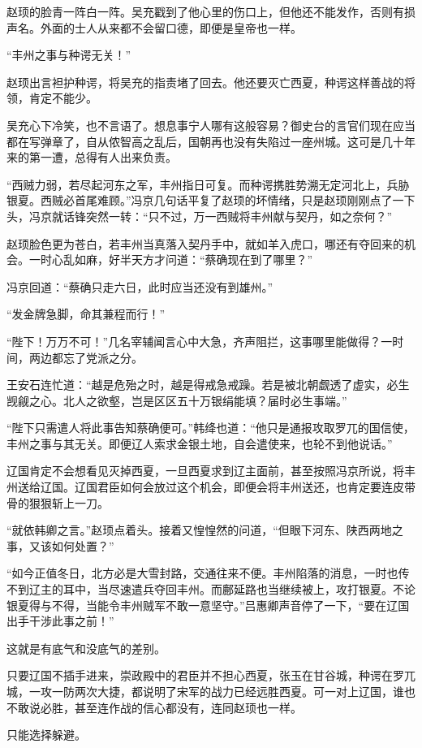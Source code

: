 赵顼的脸青一阵白一阵。吴充戳到了他心里的伤口上，但他还不能发作，否则有损声名。外面的士人从来都不会留口德，即便是皇帝也一样。

“丰州之事与种谔无关！”

赵顼出言袒护种谔，将吴充的指责堵了回去。他还要灭亡西夏，种谔这样善战的将领，肯定不能少。

吴充心下冷笑，也不言语了。想息事宁人哪有这般容易？御史台的言官们现在应当都在写弹章了，自从侬智高之乱后，国朝再也没有失陷过一座州城。这可是几十年来的第一遭，总得有人出来负责。

“西贼力弱，若尽起河东之军，丰州指日可复。而种谔携胜势溯无定河北上，兵胁银夏。西贼必首尾难顾。”冯京几句话平复了赵顼的坏情绪，只是赵顼刚刚点了一下头，冯京就话锋突然一转：“只不过，万一西贼将丰州献与契丹，如之奈何？”

赵顼脸色更为苍白，若丰州当真落入契丹手中，就如羊入虎口，哪还有夺回来的机会。一时心乱如麻，好半天方才问道：“蔡确现在到了哪里？”

冯京回道：“蔡确只走六日，此时应当还没有到雄州。”

“发金牌急脚，命其兼程而行！”

“陛下！万万不可！”几名宰辅闻言心中大急，齐声阻拦，这事哪里能做得？一时间，两边都忘了党派之分。

王安石连忙道：“越是危殆之时，越是得戒急戒躁。若是被北朝觑透了虚实，必生觊觎之心。北人之欲壑，岂是区区五十万银绢能填？届时必生事端。”

“陛下只需遣人将此事告知蔡确便可。”韩绛也道：“他只是通报攻取罗兀的国信使，丰州之事与其无关。即便辽人索求金银土地，自会遣使来，也轮不到他说话。”

辽国肯定不会想看见灭掉西夏，一旦西夏求到辽主面前，甚至按照冯京所说，将丰州送给辽国。辽国君臣如何会放过这个机会，即便会将丰州送还，也肯定要连皮带骨的狠狠斩上一刀。

“就依韩卿之言。”赵顼点着头。接着又惶惶然的问道，“但眼下河东、陕西两地之事，又该如何处置？”

“如今正值冬日，北方必是大雪封路，交通往来不便。丰州陷落的消息，一时也传不到辽主的耳中，当尽速遣兵夺回丰州。而鄜延路也当继续被上，攻打银夏。不论银夏得与不得，当能令丰州贼军不敢一意坚守。”吕惠卿声音停了一下，“要在辽国出手干涉此事之前！”

这就是有底气和没底气的差别。

只要辽国不插手进来，崇政殿中的君臣并不担心西夏，张玉在甘谷城，种谔在罗兀城，一攻一防两次大捷，都说明了宋军的战力已经远胜西夏。可一对上辽国，谁也不敢说必胜，甚至连作战的信心都没有，连同赵顼也一样。

只能选择躲避。

